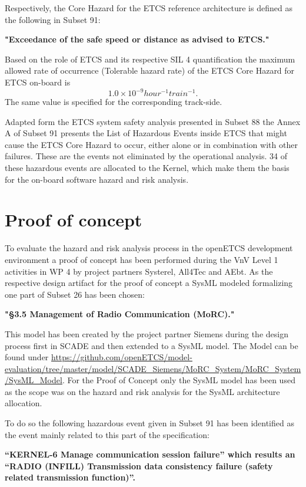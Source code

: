 \documentclass{template/openetcs_report}
\begin{document}
Respectively, the Core Hazard for the ETCS reference architecture is defined as the following in Subset 91:
\begin{center}
\textbf{"Exceedance of the safe speed or distance as advised to ETCS."}
\end{center}

Based on the role of ETCS and its respective SIL 4 quantification the maximum allowed rate of occurrence (Tolerable hazard rate) of the ETCS Core Hazard for ETCS on-board is
\[1.0\times10^{-9} hour^{-1} train^{-1}.\]
The same value is specified for the corresponding track-side.

Adapted form the ETCS system safety analysis presented in Subset 88 the Annex A of Subset 91 presents the List of Hazardous Events inside ETCS that might cause the ETCS Core Hazard to occur, either alone or in combination with other failures. These are the events not eliminated by the operational analysis. 34 of these hazardous events are allocated to the Kernel, which make them the basis for the on-board software hazard and risk analysis. 


\section{Proof of concept}
\label{sec:Proofofconcept}

To evaluate the hazard and risk analysis process in the openETCS development environment a proof of concept has been performed during the VnV Level 1 activities in WP 4 by project partners Systerel, All4Tec and AEbt. As the respective design artifact for the proof of concept a SysML modeled formalizing one part of Subset 26 has been chosen: 

\begin{center}
\textbf{"\S 3.5 Management of Radio Communication (MoRC)."}
\end{center}

This model has been created by the project partner Siemens during the design process first in SCADE and then extended to a SysML model. The Model can be found under \url{https://github.com/openETCS/model-evaluation/tree/master/model/SCADE_Siemens/MoRC_System/MoRC_System/SysML_Model}. For the Proof of Concept only the SysML model has been used as the scope was on the hazard and risk analysis for the SysML architecture allocation.

To do so the following hazardous event given in Subset 91 has been identified as the event mainly related to this part of the specification:
\begin{center}
\textbf{“KERNEL-6 Manage communication session failure” which results an “RADIO (INFILL) Transmission data consistency failure (safety related transmission function)”.}
\end{center}
\end{document}
